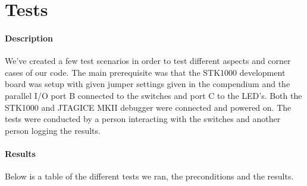 \documentclass[a4paper,11pt]{article}
\begin{document}
\newpage

\section{Tests}
\paragraph{Description}
We've created a few test scenarios in order to test different aspects and corner cases of our code. The main prerequisite was that the STK1000 development board was setup with given jumper settings given in the compendium and the parallel I/O port B connected to the switches and port C to the LED’s. Both the STK1000 and JTAGICE MKII debugger were connected and powered on. The tests were conducted by a person interacting with the switches and another person logging the results.

\paragraph{Results}
Below is a table of the different tests we ran, the preconditions and the results.
\linebreak
\end{document}
